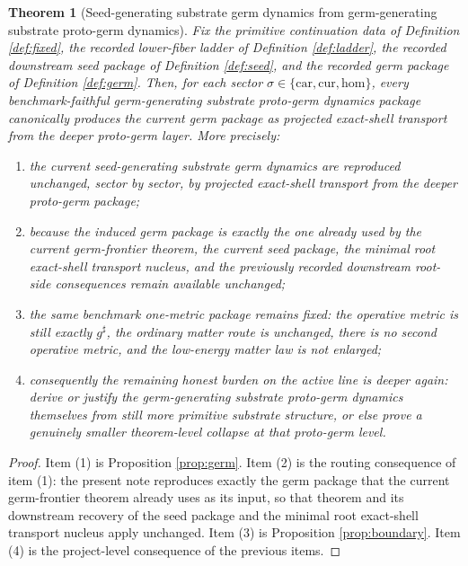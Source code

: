 \documentclass[11pt]{article}
\newcommand{\CompletedMetric}{g^{\sharp}}
\newcommand{\Car}{\mathrm{car}}
\newcommand{\Cur}{\mathrm{cur}}
\newcommand{\Hom}{\mathrm{hom}}
\newtheorem{theorem}{Theorem}
\begin{document}
\begin{theorem}[Seed-generating substrate germ dynamics from germ-generating substrate proto-germ dynamics]
\label{thm:main}
Fix the primitive continuation data of Definition \ref{def:fixed}, the recorded lower-fiber ladder of Definition \ref{def:ladder}, the recorded downstream seed package of Definition \ref{def:seed}, and the recorded germ package of Definition \ref{def:germ}. Then, for each sector \(\sigma\in\{\Car,\Cur,\Hom\}\), every benchmark-faithful germ-generating substrate proto-germ dynamics package canonically produces the current germ package as projected exact-shell transport from the deeper proto-germ layer. More precisely:
\begin{enumerate}
    \item the current seed-generating substrate germ dynamics are reproduced unchanged, sector by sector, by projected exact-shell transport from the deeper proto-germ package;
    \item because the induced germ package is exactly the one already used by the current germ-frontier theorem, the current seed package, the minimal root exact-shell transport nucleus, and the previously recorded downstream root-side consequences remain available unchanged;
    \item the same benchmark one-metric package remains fixed: the operative metric is still exactly \(\CompletedMetric\), the ordinary matter route is unchanged, there is no second operative metric, and the low-energy matter law is not enlarged;
    \item consequently the remaining honest burden on the active line is deeper again: derive or justify the germ-generating substrate proto-germ dynamics themselves from still more primitive substrate structure, or else prove a genuinely smaller theorem-level collapse at that proto-germ level.
\end{enumerate}
\end{theorem}

\begin{proof}
Item (1) is Proposition \ref{prop:germ}. Item (2) is the routing consequence of item (1): the present note reproduces exactly the germ package that the current germ-frontier theorem already uses as its input, so that theorem and its downstream recovery of the seed package and the minimal root exact-shell transport nucleus apply unchanged. Item (3) is Proposition \ref{prop:boundary}. Item (4) is the project-level consequence of the previous items.
\end{proof}
\end{document}
